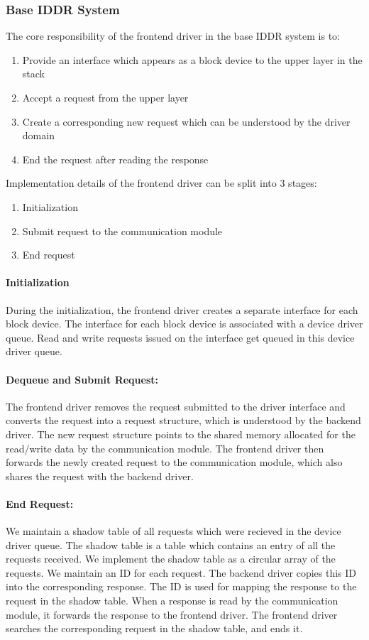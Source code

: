 \subsubsection*{Base IDDR System}
The core responsibility of the frontend driver in the base IDDR system is to:
\begin{enumerate}
\item Provide an interface which appears as a block device to the upper layer in the stack
\item Accept a request from the upper layer
\item Create a corresponding new request which can be understood by the driver domain
\item End the request after reading the response
\end{enumerate}

Implementation details of the frontend driver can be split into 3 stages: 
\begin{enumerate}
\item Initialization
\item Submit request to the communication module
\item End request
\end{enumerate}

\paragraph{Initialization}
During the initialization, the frontend driver creates a separate interface for each block device. The interface for each block device is associated with a device driver queue. Read and write requests issued on the interface get queued in this device driver queue.

\paragraph{Dequeue and Submit Request:}
The frontend driver removes the request submitted to the driver interface and converts the request into a request structure, which is understood by the backend driver. The new request structure points to the shared memory allocated for the read/write data by the communication module. The frontend driver then forwards the newly created request to the communication module, which also shares the request with the backend driver.

\paragraph{End Request:}
We maintain a shadow table of all requests which were recieved in the device driver queue. The shadow table is a table which contains an entry of all the requests received. We implement the shadow table as a circular array of the requests. We maintain an ID for each request. The backend driver copies this ID into the corresponding response. The ID is used for mapping the response to the request in the shadow table. When a response is read by the communication module, it forwards the response to the frontend driver. The frontend driver searches the corresponding request in the shadow table, and ends it. 

